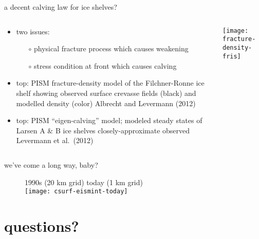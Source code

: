 \documentclass[hide notes,intlimits]{beamer}
\begin{document}
\begin{frame}{a decent calving law for ice shelves?}

\begin{columns}
\begin{column}{0.5\textwidth}
\begin{itemize}
\small
\item two issues:
  \begin{itemize}
  \item[$\circ$] physical fracture process which causes weakening
  \item[$\circ$] stress condition at front which causes calving
  \end{itemize}
\item \alert{top:} PISM fracture-density model of the Filchner-Ronne ice shelf showing observed surface crevasse fields (black) and modelled density (color) \qquad \tiny Albrecht and Levermann (2012) \small
\item \alert{top:} PISM ``eigen-calving'' model; modeled steady states of Larsen A \& B ice shelves closely-approximate observed \qquad \tiny Levermann et al.~(2012) \small
\end{itemize}
\end{column}

\begin{column}{0.5\textwidth}
\vspace{-0.1in}

\qquad \texttt{[image: fracture-density-fris]}

{}
\end{column}
\end{columns}
\end{frame}


\begin{frame}{we've come a long way, baby?}
  \vspace{-.25cm}
  \begin{figure}
    1990s (20 km grid) \hspace{1.75cm} today (1 km grid)\\
    \texttt{[image: csurf-eismint-today]}
  \end{figure}
\end{frame}


\section{questions?}
\end{document}
